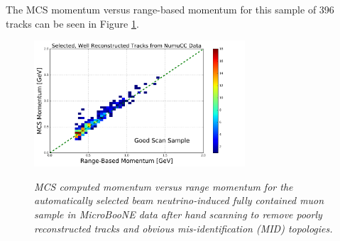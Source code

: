 \documentclass[a4paper,11pt]{article}
\begin{document}
The MCS momentum versus range-based momentum for this sample of 396 tracks can be seen in Figure \ref{realdata_goodhandscan_fig}.

\begin{figure}[ht!]
\centering
	\includegraphics[width=0.7\textwidth]{Figures/MCS_range_momentum_DataRecoTracks_goodhandscan.png} \\
\caption{\textit{MCS computed momentum versus range momentum for the automatically selected beam neutrino-induced fully contained muon sample in MicroBooNE data after hand scanning to remove poorly reconstructed tracks and obvious mis-identification (MID) topologies.}}\label{realdata_goodhandscan_fig}
\end{figure}

\end{document}
